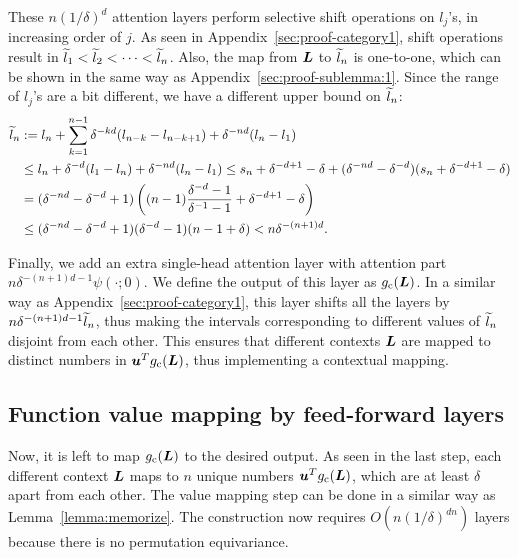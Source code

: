 These $n(1/\delta)^d$ attention layers perform selective shift operations on $l_j$'s, in increasing order of $j$. As seen in Appendix~\ref{sec:proof-category1}, shift operations result in $\widetilde{l}_1 < \widetilde{l}_2 <\dots<\widetilde{l}_n$. Also, the map from ${\bm{L}}$ to $\widetilde{l}_n$ is one-to-one, which can be shown in the same way as Appendix~\ref{sec:proof-sublemma:1}. Since the range of $l_j$'s are a bit different, we have a different upper bound on $\widetilde{l}_n$:
\begin{align*}
    \widetilde{l}_n
    &:= l_n + \sum_{k=1}^{n-1} \delta^{-kd}(l_{n-k}-l_{n-k+1}) + \delta^{-nd} (l_n-l_1)\\
    &\leq l_n + \delta^{-d} (l_1 - l_n) + \delta^{-nd}(l_n - l_1)
    \leq s_n + \delta^{-d+1} - \delta + (\delta^{-nd} - \delta^{-d}) (s_n + \delta^{-d+1} - \delta)\\
    &=(\delta^{-nd} - \delta^{-d} + 1) \left ( (n-1) \frac{\delta^{-d}-1}{\delta^{-1}-1} + \delta^{-d+1} - \delta  \right )\\
    &\leq (\delta^{-nd} - \delta^{-d} + 1) (\delta^{-d} - 1) (n-1+\delta)
    < n\delta^{-(n+1)d}.
\end{align*}

Finally, we add an extra single-head attention layer with attention part $n\delta^{-(n+1)d-1} \psi(\cdot;0)$. We define the output of this layer as $g_{\rm c}({\bm{L}})$. In a similar way as Appendix~\ref{sec:proof-category1}, this layer shifts all the layers by $n \delta^{-(n+1)d-1} \widetilde{l}_n$, thus making the intervals corresponding to different values of $\widetilde{l}_n$ disjoint from each other. This ensures that different contexts ${\bm{L}}$ are mapped to distinct numbers in ${\bm{u}}^T g_{\rm c}({\bm{L}})$, thus implementing a contextual mapping.


\subsection{Function value mapping by feed-forward layers}
Now, it is left to map $g_{\rm c}({\bm{L}})$ to the desired output.
As seen in the last step, each different context ${\bm{L}}$ maps to $n$ unique numbers ${\bm{u}}^T g_{\rm c}({\bm{L}})$, which are at least $\delta$ apart from each other. The value mapping step can be done in a similar way as Lemma~\ref{lemma:memorize}. 
The construction now requires $O(n(1/\delta)^{dn})$ layers because there is no permutation equivariance.


